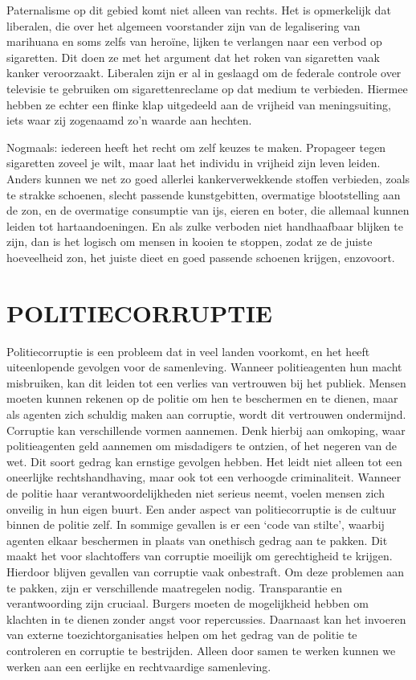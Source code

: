 \documentclass[
  a5paper,
  smalldemyvopaper,10pt,twoside,onecolumn,openright,extrafontsizes,hidelinks]{memoir}
\begin{document}
Paternalisme op dit gebied komt niet alleen van rechts. Het is
opmerkelijk dat liberalen, die over het algemeen voorstander zijn van de
legalisering van marihuana en soms zelfs van heroïne, lijken te
verlangen naar een verbod op sigaretten. Dit doen ze met het argument
dat het roken van sigaretten vaak kanker veroorzaakt. Liberalen zijn er
al in geslaagd om de federale controle over televisie te gebruiken om
sigarettenreclame op dat medium te verbieden. Hiermee hebben ze echter
een flinke klap uitgedeeld aan de vrijheid van meningsuiting, iets waar
zij zogenaamd zo'n waarde aan hechten.

Nogmaals: iedereen heeft het recht om zelf keuzes te maken. Propageer
tegen sigaretten zoveel je wilt, maar laat het individu in vrijheid zijn
leven leiden. Anders kunnen we net zo goed allerlei kankerverwekkende
stoffen verbieden, zoals te strakke schoenen, slecht passende
kunstgebitten, overmatige blootstelling aan de zon, en de overmatige
consumptie van ijs, eieren en boter, die allemaal kunnen leiden tot
hartaandoeningen. En als zulke verboden niet handhaafbaar blijken te
zijn, dan is het logisch om mensen in kooien te stoppen, zodat ze de
juiste hoeveelheid zon, het juiste dieet en goed passende schoenen
krijgen, enzovoort.

\section{POLITIECORRUPTIE}\label{politiecorruptie}

Politiecorruptie is een probleem dat in veel landen voorkomt, en het
heeft uiteenlopende gevolgen voor de samenleving. Wanneer politieagenten
hun macht misbruiken, kan dit leiden tot een verlies van vertrouwen bij
het publiek. Mensen moeten kunnen rekenen op de politie om hen te
beschermen en te dienen, maar als agenten zich schuldig maken aan
corruptie, wordt dit vertrouwen ondermijnd. Corruptie kan verschillende
vormen aannemen. Denk hierbij aan omkoping, waar politieagenten geld
aannemen om misdadigers te ontzien, of het negeren van de wet. Dit soort
gedrag kan ernstige gevolgen hebben. Het leidt niet alleen tot een
oneerlijke rechtshandhaving, maar ook tot een verhoogde criminaliteit.
Wanneer de politie haar verantwoordelijkheden niet serieus neemt, voelen
mensen zich onveilig in hun eigen buurt. Een ander aspect van
politiecorruptie is de cultuur binnen de politie zelf. In sommige
gevallen is er een `code van stilte', waarbij agenten elkaar beschermen
in plaats van onethisch gedrag aan te pakken. Dit maakt het voor
slachtoffers van corruptie moeilijk om gerechtigheid te krijgen.
Hierdoor blijven gevallen van corruptie vaak onbestraft. Om deze
problemen aan te pakken, zijn er verschillende maatregelen nodig.
Transparantie en verantwoording zijn cruciaal. Burgers moeten de
mogelijkheid hebben om klachten in te dienen zonder angst voor
repercussies. Daarnaast kan het invoeren van externe
toezichtorganisaties helpen om het gedrag van de politie te controleren
en corruptie te bestrijden. Alleen door samen te werken kunnen we werken
aan een eerlijke en rechtvaardige samenleving.
\end{document}
